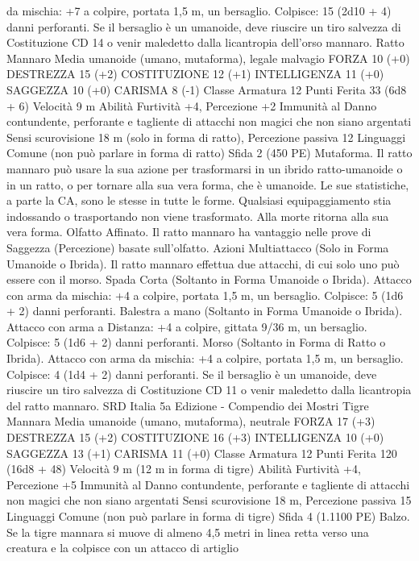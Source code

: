 \begin{multicols}{2}
da mischia: +7 a colpire, portata 1,5 m, un bersaglio.
Colpisce: 15 (2d10 + 4) danni perforanti. Se il bersaglio è un
umanoide, deve riuscire un tiro salvezza di Costituzione CD 14 o
venir maledetto dalla licantropia dell’orso mannaro.
Ratto Mannaro
Media umanoide (umano, mutaforma), legale malvagio
FORZA 10 (+0)
DESTREZZA 15 (+2)
COSTITUZIONE 12 (+1)
INTELLIGENZA 11 (+0)
SAGGEZZA 10 (+0)
CARISMA 8 (-1)
Classe Armatura 12
Punti Ferita 33 (6d8 + 6)
Velocità 9 m
Abilità Furtività +4, Percezione +2
Immunità al Danno contundente, perforante e tagliente di
attacchi non magici che non siano argentati
Sensi scurovisione 18 m (solo in forma di ratto), Percezione
passiva 12
Linguaggi Comune (non può parlare in forma di ratto)
Sfida 2 (450 PE)
Mutaforma. Il ratto mannaro può usare la sua azione per
trasformarsi in un ibrido ratto-umanoide o in un ratto, o per
tornare alla sua vera forma, che è umanoide. Le sue statistiche, a
parte la CA, sono le stesse in tutte le forme. Qualsiasi
equipaggiamento stia indossando o trasportando non viene
trasformato. Alla morte ritorna alla sua vera forma.
Olfatto Affinato. Il ratto mannaro ha vantaggio nelle prove di
Saggezza (Percezione) basate sull’olfatto.
Azioni
Multiattacco (Solo in Forma Umanoide o Ibrida). Il ratto
mannaro effettua due attacchi, di cui solo uno può essere con il
morso.
Spada Corta (Soltanto in Forma Umanoide o Ibrida). Attacco
con arma da mischia: +4 a colpire, portata 1,5 m, un bersaglio.
Colpisce: 5 (1d6 + 2) danni perforanti.
Balestra a mano (Soltanto in Forma Umanoide o Ibrida).
Attacco con arma a Distanza: +4 a colpire, gittata 9/36 m, un
bersaglio.
Colpisce: 5 (1d6 + 2) danni perforanti.
Morso (Soltanto in Forma di Ratto o Ibrida). Attacco con arma
da mischia: +4 a colpire, portata 1,5 m, un bersaglio.
Colpisce: 4 (1d4 + 2) danni perforanti. Se il bersaglio è un
umanoide, deve riuscire un tiro salvezza di Costituzione CD 11 o
venir maledetto dalla licantropia del ratto mannaro.
SRD Italia 5a Edizione - Compendio dei Mostri
Tigre Mannara
Media umanoide (umano, mutaforma), neutrale
FORZA 17 (+3)
DESTREZZA 15 (+2)
COSTITUZIONE 16 (+3)
INTELLIGENZA 10 (+0)
SAGGEZZA 13 (+1)
CARISMA 11 (+0)
Classe Armatura 12
Punti Ferita 120 (16d8 + 48)
Velocità 9 m (12 m in forma di tigre)
Abilità Furtività +4, Percezione +5
Immunità al Danno contundente, perforante e tagliente di
attacchi non magici che non siano argentati
Sensi scurovisione 18 m, Percezione passiva 15
Linguaggi Comune (non può parlare in forma di tigre)
Sfida 4 (1.1100 PE)
Balzo. Se la tigre mannara si muove di almeno 4,5 metri in linea
retta verso una creatura e la colpisce con un attacco di artiglio

\end{multicols}
